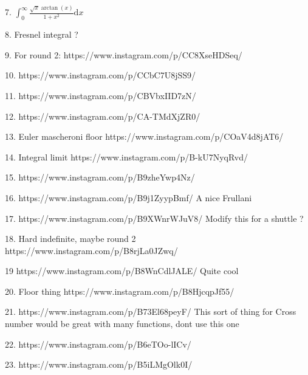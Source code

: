 \documentclass{article}
\newcommand{\dd}{\mathrm{d}}
\begin{document}
7. $\int_0^{\infty} \frac{\sqrt{x}\arctan(x)}{1+x^2} \dd x$

8. Fresnel integral ? 

9. For round 2: https://www.instagram.com/p/CC8XseHDSeq/ 

10. https://www.instagram.com/p/CCbC7U8jSS9/

11. https://www.instagram.com/p/CBVbxIID7zN/

12. https://www.instagram.com/p/CA-TMdXjZR0/

13. Euler mascheroni floor https://www.instagram.com/p/COaV4d8jAT6/

14. Integral limit https://www.instagram.com/p/B-kU7NyqRvd/

15. https://www.instagram.com/p/B9zheYwp4Nz/

16. https://www.instagram.com/p/B9j1ZyypBmf/ A nice Frullani 

17. https://www.instagram.com/p/B9XWnrWJuV8/ Modify this for a shuttle ?

18. Hard indefinite, maybe round 2 https://www.instagram.com/p/B8rjLa0JZwq/

19 https://www.instagram.com/p/B8WnCdlJALE/ Quite cool

20. Floor thing https://www.instagram.com/p/B8HjcqpJf55/

21. https://www.instagram.com/p/B73El68peyF/ This sort of thing for Cross number would be great with many functions, dont use this one

22. https://www.instagram.com/p/B6eTOo-lICv/

23. https://www.instagram.com/p/B5iLMgOlk0I/ 
\end{document}
